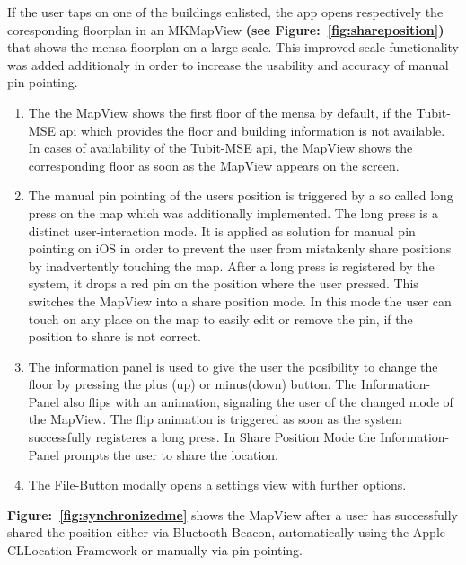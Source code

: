 If the user taps on one of the buildings enlisted, the app opens respectively
the coresponding floorplan in an MKMapView \textbf{(see Figure:~\ref{fig:shareposition})} that shows the mensa floorplan on a large scale. This improved scale functionality was added additionaly in order to increase the usability and accuracy of manual pin-pointing.

\begin{enumerate}
\item The the MapView shows the first floor of the mensa by default, if the Tubit-MSE api which provides the floor and building information is not available. In cases of availability of the Tubit-MSE api, the MapView shows the corresponding floor as soon as the MapView appears on the screen.

\item The manual pin pointing of the users position is triggered by a so called long press on the map which was additionally implemented. The long press is a distinct user-interaction mode. It is applied as solution for manual pin pointing on iOS in order to prevent the user from mistakenly share  positions by inadvertently touching the map. After a long press is registered by the system, it drops a red pin on the position where the user pressed. This switches the MapView into a share position mode. In this mode the user can touch on any place on the map to easily edit or remove the pin, if the position to share is not correct.

\item The information panel is used to give the user the posibility to change the floor by pressing the plus (up) or minus(down) button. The Information-Panel also flips with an animation, signaling the user of the changed mode of the MapView. The flip animation is triggered as soon as the system successfully registeres a long press. In Share Position Mode the Information-Panel prompts the user to share the location.

\item The File-Button modally opens a settings view with further options.
\end{enumerate}


\textbf{Figure:~\ref{fig:synchronizedme}} shows the MapView after a user has successfully shared the position either via Bluetooth Beacon, automatically using the Apple CLLocation Framework or manually via pin-pointing.


